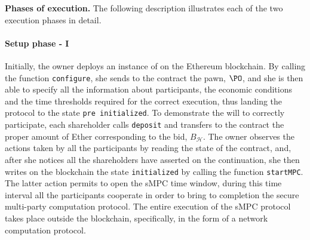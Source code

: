 \medskip\textbf{Phases of execution.} The following description illustrates each of the two execution phases in detail.


\paragraph{Setup phase - I}
Initially, the owner deploys an instance of \shortname on the Ethereum blockchain. 
By calling the function \texttt{configure}, she sends to the contract the pawn, $\PO$, and she is then able to specify all the information about participants, the economic conditions and the time thresholds required for the correct execution, thus landing the protocol to the state \texttt{pre initialized}. 
To demonstrate the will to correctly participate, each shareholder calls \texttt{deposit} and transfers to the contract the proper amount of Ether corresponding to the bid, $B_{\mathcal{H}}$. 
The owner observes the actions taken by all the participants by reading the state of the contract, and, after she notices all the shareholders have asserted on the continuation, she then writes on the blockchain the state \texttt{initialized} by calling the function \texttt{startMPC}. The latter action permits to open the sMPC time window, during this time interval all the participants cooperate in order to bring to completion the secure multi-party computation protocol. The entire execution of the sMPC protocol takes place outside the blockchain, specifically, in the form of a network computation protocol.

